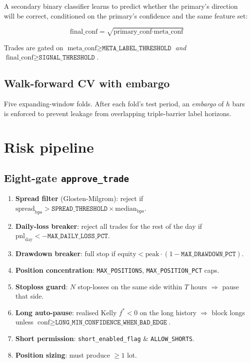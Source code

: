 \documentclass[11pt,a4paper]{article}
\begin{document}
A secondary binary classifier learns to predict whether the primary's
direction will be correct, conditioned on the primary's confidence and
the same feature set:

\[
\text{final\_conf} = \sqrt{\text{primary\_conf} \cdot \text{meta\_conf}}
\]

Trades are gated on
$\text{meta\_conf} \geq \texttt{META\_LABEL\_THRESHOLD}$ \emph{and}
$\text{final\_conf} \geq \texttt{SIGNAL\_THRESHOLD}$.

\subsection{Walk-forward CV with embargo}

Five expanding-window folds. After each fold's test period, an
\emph{embargo} of $h$ bars is enforced to prevent leakage from
overlapping triple-barrier label horizons.

\section{Risk pipeline}

\subsection{Eight-gate \texttt{approve\_trade}}

\begin{enumerate}
  \item \textbf{Spread filter} (Glosten-Milgrom): reject if
        $\text{spread}_{\text{bps}} > \texttt{SPREAD\_THRESHOLD} \times
        \text{median}_{\text{bps}}$.
  \item \textbf{Daily-loss breaker}: reject all trades for the rest of
        the day if $\text{pnl}_{\text{day}} < -\texttt{MAX\_DAILY\_LOSS\_PCT}$.
  \item \textbf{Drawdown breaker}: full stop if
        $\text{equity} < \text{peak} \cdot (1 - \texttt{MAX\_DRAWDOWN\_PCT})$.
  \item \textbf{Position concentration}: \texttt{MAX\_POSITIONS},
        \texttt{MAX\_POSITION\_PCT} caps.
  \item \textbf{Stoploss guard}: $N$ stop-losses on the same side
        within $T$ hours $\Rightarrow$ pause that side.
  \item \textbf{Long auto-pause}: realised Kelly $f^* < 0$ on the long
        history $\Rightarrow$ block longs unless
        $\text{conf} \geq \texttt{LONG\_MIN\_CONFIDENCE\_WHEN\_BAD\_EDGE}$.
  \item \textbf{Short permission}:
        \texttt{short\_enabled\_flag} \& \texttt{ALLOW\_SHORTS}.
  \item \textbf{Position sizing}: must produce $\geq 1$ lot.
\end{enumerate}
\end{document}
